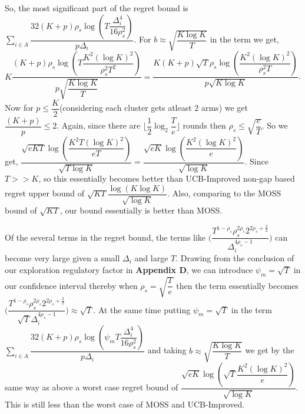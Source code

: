 \begin{remark}
So, the most significant part of the regret bound is $\sum_{i\in A}\dfrac{32(K+p)\rho_{s}\log{(T\dfrac{\Delta_{i}^{4}}{16\rho_{s}^{2}})}}{p\Delta_{i}}$. For $b\approx \sqrt{\dfrac{K\log K}{T}}$ in the term we get, $K\dfrac{(K+p)\rho_{s}\log{(T\dfrac{K^{2}(\log K)^{2}}{\rho_{s}^{2}T^{2}})}}{p \sqrt{\dfrac{K\log K}{T}}}=\dfrac{K(K+p)\sqrt{T}\rho_{s}\log{(\dfrac{K^{2}(\log K)^{2}}{\rho_{s}^{2}T})}}{p \sqrt{K\log K}}$. Now for $p\leq \dfrac{K}{2}$(considering each cluster gets atleast $2$ arms) we get $\dfrac{(K+p)}{p}\leq  2$. Again, since there are $\big \lfloor \dfrac{1}{2}\log_{2} \dfrac{T}{e}\big\rfloor$ rounds then $\rho_{s}\leq \sqrt{\dfrac{e}{T}}$. So we get, $\dfrac{\sqrt{eKT}\log{(\dfrac{K^{2}T(\log K)^{2}}{eT})}}{\sqrt{T\log K}}=\dfrac{\sqrt{eK}\log{(\dfrac{K^{2}(\log K)^{2}}{e})}}{\sqrt{\log K}}$. Since $T>> K$, so this essentially becomes better than UCB-Improved non-gap based regret upper bound of $\sqrt{KT}\dfrac{\log(K\log K)}{\sqrt{\log K}}$. Also, comparing to the MOSS bound of $\sqrt{KT}$, our bound essentially is better than MOSS.
\end{remark}

\begin{remark}
Of the several terms in the regret bound, the terms like  $\bigg(\dfrac{T^{1-\rho_{s}}\rho_{s}^{2\rho_{s}}2^{2\rho_{s}+\frac{3}{2}}}{\Delta_{i}^{4\rho_{s}-1}} \bigg)$ can become very large given a small $\Delta_{i}$ and large $T$. Drawing from the conclusion of our exploration regulatory factor in \textbf{Appendix D}, we can introduce $\psi_{m}=\sqrt{T}$ in our confidence interval thereby when $\rho_{s}=\sqrt{\dfrac{T}{e}}$ then the term essentially becomes $\bigg(\dfrac{T^{1-\rho_{s}}\rho_{s}^{2\rho_{s}}2^{2\rho_{s}+\frac{3}{2}}}{\sqrt{T}\Delta_{i}^{4\rho_{s}-1}} \bigg) \approx \sqrt{T}$. At the same time putting $\psi_{m}=\sqrt{T}$ in the term $\sum_{i\in A}\dfrac{32(K+p)\rho_{s}\log{(\psi_{m}T\dfrac{\Delta_{i}^{4}}{16\rho_{s}^{2}})}}{p\Delta_{i}}$ and taking $b\approx \sqrt{\dfrac{K\log K}{T}}$ we get by the same way as above a worst case regret bound of $\dfrac{\sqrt{eK}\log{(\sqrt{T}\dfrac{K^{2}(\log K)^{2}}{e})}}{\sqrt{\log K}}$. This is still less than the worst case of MOSS and UCB-Improved.
\end{remark}

